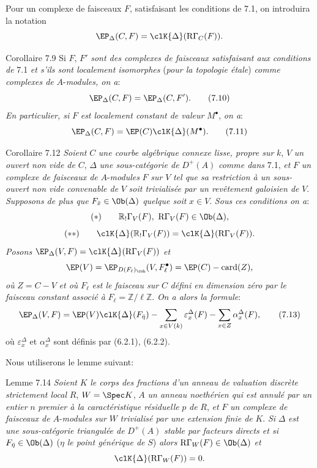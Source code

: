 Pour un complexe de faisceaux $F$, satisfaisant les conditions de 7.1, on introduira la notation
\[
\EP_\Delta(C,F)=\clK{\Delta}(\mathrm{R}\Gamma_C(F)).
\]

\begin{statement}{Corollaire 7.9}
Si $F$, $F'$ \emph{sont des complexes de faisceaux satisfaisant aux conditions de} 7.1 \emph{et s'ils sont localement isomorphes} (\emph{pour la topologie étale}) \emph{comme complexes de} $A$-\emph{modules, on a}:
\[
\EP_\Delta(C,F)=\EP_\Delta(C,F').
\tag{7.10}
\]
\emph{En particulier, si} $F$ \emph{est localement constant de valeur} $M^\bullet$, \emph{on a}:
\[
\EP_\Delta(C,F)=\EP(C)\clK{\Delta}(M^\bullet).
\tag{7.11}
\]
\end{statement}

\begin{statement}{Corollaire 7.12}
\emph{Soient} $C$ \emph{une courbe algébrique connexe lisse, propre sur} $k$, $V$ \emph{un ouvert non vide de} $C$, $\Delta$ \emph{une sous-catégorie de} $D^+(A)$ \emph{comme dans} 7.1, \emph{et} $F$ \emph{un complexe de faisceaux de} $A$-\emph{modules} $F$ \emph{sur} $V$ \emph{tel que sa restriction à un sous-ouvert non vide convenable de} $V$ \emph{soit trivialisée par un revêtement galoisien de} $V$. \emph{Supposons de plus que} $F_{\bar x}\in\Ob(\Delta)$ \emph{quelque soit} $x\in V$. \emph{Sous ces conditions on a}:
\[
(*)\qquad \mathbb{R}_!\Gamma_V(F),\ \mathrm{R}\Gamma_V(F)\in\Ob(\Delta),
\]
\[
(**)\qquad
\clK{\Delta}(\mathbb{R}_!\Gamma_V(F))=\clK{\Delta}(\mathrm{R}\Gamma_V(F)).
\]
\emph{Posons} $\EP_\Delta(V,F)=\clK{\Delta}(\mathrm{R}\Gamma_V(F))$ \emph{et}
\[
\EP(V)=\EP_{D(F_\ell)_{\coh}}(V,F_\ell^\bullet)=\EP(C)-\operatorname{card}(Z),
\]
\emph{où} $Z=C-V$ \emph{et où} $F_\ell$ \emph{est le faisceau sur} $C$ \emph{défini en dimension zéro par le faisceau constant associé à} $F_\ell=\mathbb{Z}/\ell\mathbb{Z}$. \emph{On a alors la formule}:
\[
\EP_\Delta(V,F)
=
\EP(V)\clK{\Delta}(F_{\bar\eta})
-\sum_{x\in V(k)}\varepsilon_x^\Delta(F)
-\sum_{x\in Z}\alpha_x^\Delta(F),
\tag{7.13}
\]
où $\varepsilon_x^\Delta$ et $\alpha_x^\Delta$ sont
définis par (6.2.1), (6.2.2).
\end{statement}

Nous utiliserons le lemme suivant:

\begin{statement}{Lemme 7.14}
\emph{Soient} $K$ \emph{le corps des fractions d'un anneau de valuation discrète strictement local} $R$, $W=\Spec K$, $A$ \emph{un anneau noethérien qui est annulé par un entier} $n$ \emph{premier à la caractéristique résiduelle} $p$ \emph{de} $R$, \emph{et} $F$ \emph{un complexe de faisceaux de} $A$-\emph{modules sur} $W$ \emph{trivialisé par une extension finie de} $K$. \emph{Si} $\Delta$ \emph{est une sous-catégorie triangulée de} $D^+(A)$ \emph{stable par facteurs directs et si} $F_{\bar\eta}\in\Ob(\Delta)$ ($\eta$ \emph{le point générique de} $S$) \emph{alors} $\mathrm{R}\Gamma_W(F)\in\Ob(\Delta)$ \emph{et}
\[
\clK{\Delta}(\mathrm{R}\Gamma_W(F))=0.
\]
\end{statement}

